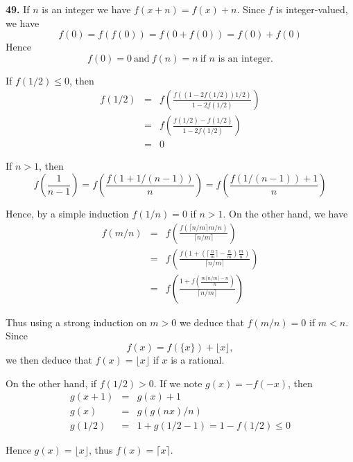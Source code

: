 \documentclass[a4paper,12pt]{article}
\newcommand{\newpar}[1]{\bigskip \noindent \textbf{#1.}}
\begin{document}
\newpar{49} If $n$ is an integer we have $f(x+n) = f(x) + n$.  Since
$f$ is integer-valued, we have
\[ f(0) = f(f(0)) = f(0 + f(0)) = f(0) + f(0)\]
Hence
\[ f(0) = 0\ \mbox{and}\ f(n) = n\ \mbox{if $n$ is an integer}.\]

If $f(1/2) \le 0$, then
\begin{eqnarray*}
  f(1/2) &=& f\left( \frac{f((1-2f(1/2))1/2)}{1-2f(1/2)} \right) \\
  &=& f\left( \frac{f(1/2) - f(1/2)}{1 - 2f(1/2)} \right) \\
  &=& 0
\end{eqnarray*}

If $n > 1$, then
\[ f\left(\frac{1}{n-1}\right) = f\left(
\frac{f(1+1/(n-1))}{n}\right) =
f\left( \frac{f(1/(n-1)) + 1}{n} \right)\]

Hence, by a simple induction $f(1/n) = 0$ if $n > 1$.  On the other
hand, we have
\begin{eqnarray*}
  f(m/n) &=& f\left( \frac{f(\lceil n/m\rceil m/n)}{\lceil n/m\rceil}
  \right) \\
  &=& f\left( \frac{ f\left( 1 + \left(\lceil \frac{n}{m} \rceil -
    \frac{n}{m} \right) \frac{m}{n} \right) }{\lceil n/m\rceil}
  \right) \\
  &=& f\left( \frac{1 + f\left( \frac{m\lceil n/m\rceil - n}{n}
    \right) }{\lceil n/m\rceil}\right)
\end{eqnarray*}

Thus using a strong induction on $m > 0$ we deduce that $f(m/n) = 0$
if $m < n$.  Since
\[ f(x) = f(\{x\}) + \lfloor x\rfloor,\]
we then deduce that $f(x) = \lfloor x\rfloor$ if $x$ is a rational.

On the other hand, if $f(1/2) > 0$.  If we note $g(x) = -f(-x)$, then
\begin{eqnarray*}
  g(x+1) &=& g(x)+1 \\
  g(x) &=& g(g(nx)/n) \\
  g(1/2) &=& 1 + g(1/2 - 1) = 1 - f(1/2) \le 0
\end{eqnarray*}

Hence $g(x) = \lfloor x\rfloor$, thus $f(x) = \lceil x\rceil$.
\end{document}
